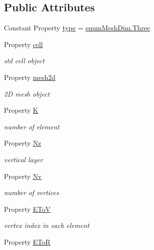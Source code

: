 \subsection*{Public Attributes}
\begin{DoxyCompactItemize}
\item 
Constant Property \hyperlink{class_ndg_extend_mesh3d_a75a9e610f14c80a86cc82aed5953ddaa}{type} = \hyperlink{classenum_mesh_dim_a5a67c42a0c79eab8e32b9c613507a672a4e749d96848830bd18200e5055f83634}{enum\+Mesh\+Dim.\+Three}
\item 
Property \hyperlink{class_ndg_extend_mesh3d_a56772bd06c09acb1334f90e959f3f767}{cell}
\begin{DoxyCompactList}\small\item\em std cell object \end{DoxyCompactList}\item 
Property \hyperlink{class_ndg_extend_mesh3d_a93abeffb02cc5fb2c6b4f8786d31e282}{mesh2d}
\begin{DoxyCompactList}\small\item\em 2D mesh object \end{DoxyCompactList}\item 
Property \hyperlink{class_ndg_extend_mesh3d_a93ca38b920f55095f981855e6401a3fb}{K}
\begin{DoxyCompactList}\small\item\em number of element \end{DoxyCompactList}\item 
Property \hyperlink{class_ndg_extend_mesh3d_a68d35b55601da05f983c888ce3309849}{Nz}
\begin{DoxyCompactList}\small\item\em vertical layer \end{DoxyCompactList}\item 
Property \hyperlink{class_ndg_extend_mesh3d_ab987a5dc128812bd25ac028a70212adf}{Nv}
\begin{DoxyCompactList}\small\item\em number of vertices \end{DoxyCompactList}\item 
Property \hyperlink{class_ndg_extend_mesh3d_a8d857a0cfba06d4d7d16857e0e98e4e0}{E\+ToV}
\begin{DoxyCompactList}\small\item\em vertex index in each element \end{DoxyCompactList}\item 
Property \hyperlink{class_ndg_extend_mesh3d_a707fc48fcf344105ef2a187af5fff963}{E\+ToR}

\end{DoxyCompactItemize}
